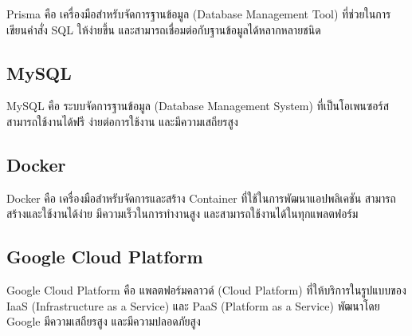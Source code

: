 Prisma คือ เครื่องมือสำหรับจัดการฐานข้อมูล (Database Management Tool) ที่ช่วยในการเขียนคำสั่ง SQL ให้ง่ายขึ้น และสามารถเชื่อมต่อกับฐานข้อมูลได้หลากหลายชนิด \cite{WhatIsPrisma}


\newpage

\subsection{MySQL}

MySQL คือ ระบบจัดการฐานข้อมูล (Database Management System) ที่เป็นโอเพนซอร์ส สามารถใช้งานได้ฟรี ง่ายต่อการใช้งาน และมีความเสถียรสูง \cite{WhatIsMySQL}


\subsection{Docker}

Docker คือ เครื่องมือสำหรับจัดการและสร้าง Container ที่ใช้ในการพัฒนาแอปพลิเคชัน สามารถสร้างและใช้งานได้ง่าย มีความเร็วในการทำงานสูง และสามารถใช้งานได้ในทุกแพลตฟอร์ม \cite{WhatIsDocker}


\subsection{Google Cloud Platform}

Google Cloud Platform คือ แพลตฟอร์มคลาวด์ (Cloud Platform) ที่ให้บริการในรูปแบบของ IaaS (Infrastructure as a Service) และ PaaS (Platform as a Service) พัฒนาโดย Google มีความเสถียรสูง และมีความปลอดภัยสูง \cite{GCPNewbie}
